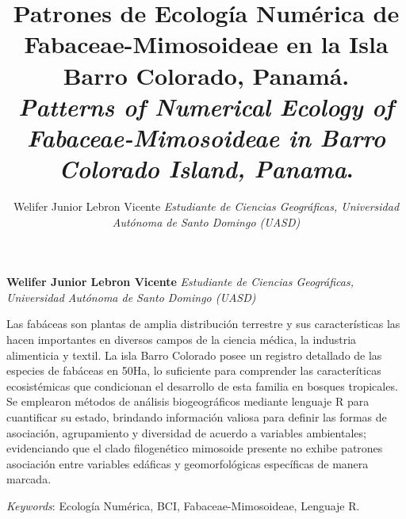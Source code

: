 \documentclass[11pt,]{article}
\title{Patrones de Ecología Numérica de Fabaceae-Mimosoideae en la Isla Barro
Colorado, Panamá.\\
\emph{Patterns of Numerical Ecology of Fabaceae-Mimosoideae in Barro
Colorado Island, Panama}.\\  }
\author{\Large Welifer Junior Lebron Vicente\vspace{0.05in} \newline\normalsize\emph{Estudiante de Ciencias Geográficas, Universidad Autónoma de Santo
Domingo (UASD)}  }
\date{}
\newcommand*{\authorfont}{\fontfamily{phv}\selectfont}
\renewenvironment{abstract}
 {{%
    \setlength{\leftmargin}{0mm}
    \setlength{\rightmargin}{\leftmargin}%
  }%
  \relax}
 {\endlist}
\begin{document}
	
%

{%
\setlength{\parindent}{0pt}
\thispagestyle{plain}
{\fontsize{18}{20}\selectfont\raggedright 
\maketitle  %

}

{
   \vskip 13.5pt\relax \normalsize\fontsize{11}{12} 
\textbf{\authorfont Welifer Junior Lebron Vicente} \hskip 15pt \emph{\small Estudiante de Ciencias Geográficas, Universidad Autónoma de Santo
Domingo (UASD)}   

}

}








\begin{abstract}

    \hbox{\vrule height .2pt width 39.14pc}

    \vskip 8.5pt %

\noindent Las fabáceas son plantas de amplia distribución terrestre y sus
características las hacen importantes en diversos campos de la ciencia
médica, la industria alimenticia y textil. La isla Barro Colorado posee
un registro detallado de las especies de fabáceas en 50Ha, lo suficiente
para comprender las caracteríticas ecosistémicas que condicionan el
desarrollo de esta familia en bosques tropicales. Se emplearon métodos
de análisis biogeográficos mediante lenguaje R para cuantificar su
estado, brindando información valiosa para definir las formas de
asociación, agrupamiento y diversidad de acuerdo a variables
ambientales; evidenciando que el clado filogenético mimosoide presente
no exhibe patrones asociación entre variables edáficas y geomorfológicas
específicas de manera marcada.


\vskip 8.5pt \noindent \emph{Keywords}: Ecología Numérica, BCI, Fabaceae-Mimosoideae, Lenguaje R. \par

    \hbox{\vrule height .2pt width 39.14pc}



\end{abstract}
\end{document}
